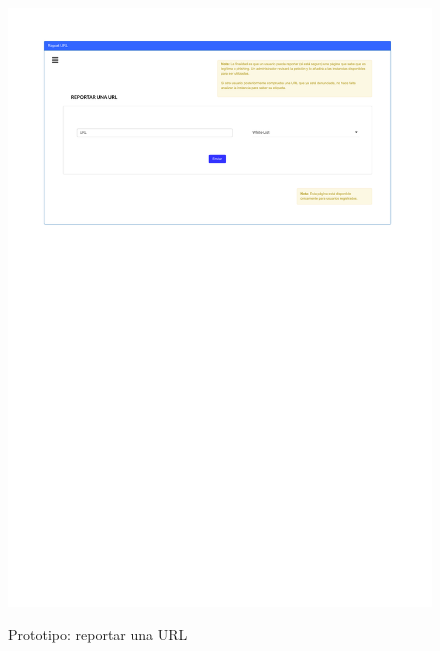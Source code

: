 \begin{figure}[h]
	\caption{Prototipo: reportar una URL}
	\centering
	\includegraphics[width=\textwidth]{../img/anexos/mockups/3-mockups-report_url}
	\label{mock:report_url}
\end{figure}

